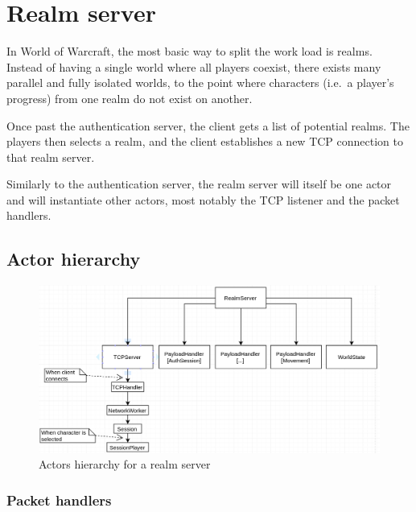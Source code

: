 \documentclass[paper=a4, fontsize=11pt]{scrartcl}
\begin{document}

\section{Realm server}

In World of Warcraft, the most basic way to split the work load is
realms.
Instead of having a single world where all players coexist, there exists many
parallel and fully isolated worlds, to the point where characters (i.e.\ a
player's progress) from one realm do not exist on another.

Once past the authentication server, the client gets a list of potential realms.
The players then selects a realm, and the client establishes a new TCP
connection to that realm server.

Similarly to the authentication server, the realm server will itself be one
actor and will instantiate other actors, most notably the TCP listener and the
packet handlers.


\subsection{Actor hierarchy}

\begin{figure}[htb!]
    \centering
    \includegraphics[width=\textwidth]{realmactors}
    \caption{Actors hierarchy for a realm server}
\end{figure}

\subsubsection{Packet handlers}
\end{document}
